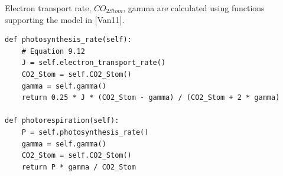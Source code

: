 \documentclass[a4paper]{article}
\numberwithin{equation}{section}
\begin{document}
Electron transport rate, \( CO_{2 Stom} \), gamma are calculated using functions supporting the model in [Van11].
\begin{mdframed}[leftline=false,rightline=false,backgroundcolor=magenta!10,nobreak=true]
  \begin{verbatim}
def photosynthesis_rate(self):
    # Equation 9.12
    J = self.electron_transport_rate()
    CO2_Stom = self.CO2_Stom()
    gamma = self.gamma()
    return 0.25 * J * (CO2_Stom - gamma) / (CO2_Stom + 2 * gamma)
    
def photorespiration(self):
    P = self.photosynthesis_rate()
    gamma = self.gamma()
    CO2_Stom = self.CO2_Stom()
    return P * gamma / CO2_Stom
  \end{verbatim}
\end{mdframed}

\newpage
\end{document}

